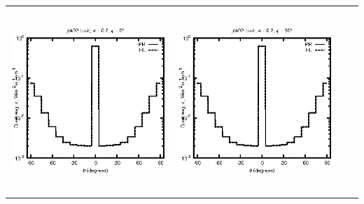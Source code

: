 \begin{tabular}{c c c c}
\includegraphics[height=7cm]{../eps/jok02_Lu_ir_fwd.eps} &
\includegraphics[height=7cm]{../eps/jok02_Lu_ir_cross.eps} \\
\end{tabular}

\pagebreak

